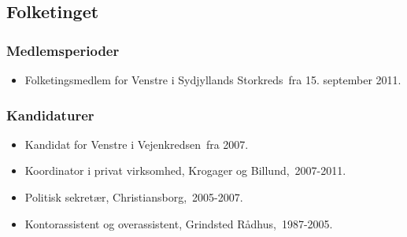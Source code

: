 \documentclass[11pt, a4paper]{awesome-cv}
\begin{document}
\begin{cvletter}
\subsection*{Folketinget}
\subsubsection*{Medlemsperioder}
\begin{itemize}
\item Folketingsmedlem for Venstre i Sydjyllands Storkreds fra 15. september 2011.
\end{itemize}
\subsubsection*{Kandidaturer}
\begin{itemize}
\item Kandidat for Venstre i Vejenkredsen fra 2007.
\end{itemize}
\begin{itemize}
\item Koordinator i privat virksomhed, Krogager og Billund, 2007-2011.
\item Politisk sekretær, Christiansborg, 2005-2007.
\item Kontorassistent og overassistent, Grindsted Rådhus, 1987-2005.
\end{itemize}
\end{cvletter}
\end{document}
